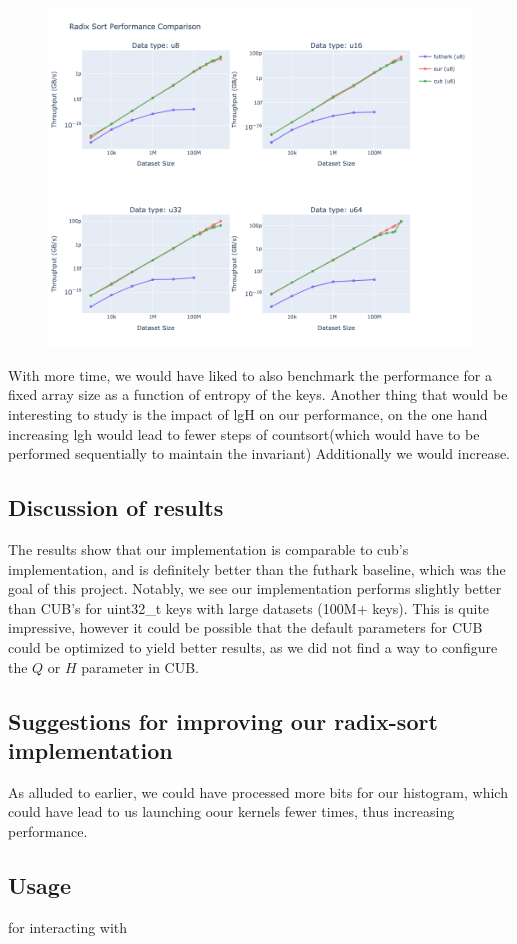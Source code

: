 \documentclass{article}
\begin{document}
\begin{figure}[h]
\includegraphics[width=1\textwidth]{images/combined_benchmarks.png}
\end{figure}

With more time, we would have liked to also benchmark the performance for a fixed array size as a function of entropy of the keys.
Another thing that would be interesting to study is the impact of lgH on our performance, on the one hand increasing lgh would lead to fewer steps of countsort(which would have to be performed sequentially to maintain the invariant)
Additionally we would increase.


\subsection{Discussion of results}
The results show that our implementation is comparable to cub's implementation, and is definitely better than the futhark baseline, which was the goal of this project. Notably, we see our implementation performs slightly better than CUB's for uint32\_t keys with large datasets (100M+ keys). This is quite impressive, however it could be possible that the default parameters for CUB could be optimized to yield better results, as we did not find a way to configure the $Q$ or $H$ parameter in CUB. 

\subsection{Suggestions for improving our radix-sort implementation}
As alluded to earlier, we could have processed more bits for our histogram, which could have lead to us launching oour kernels fewer times, thus increasing performance.

\subsection{Usage}

for interacting with 



\end{document}
